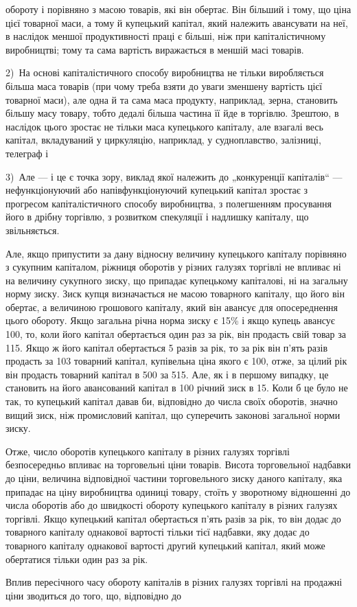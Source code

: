 \parcont{}  %
обороту і порівняно з масою товарів, які він обертає. Він більший і
тому, що ціна цієї товарної маси, а тому й купецький капітал,
який належить авансувати на неї, в наслідок меншої продуктивності
праці є більші, ніж при капіталістичному виробництві;
тому та сама вартість виражається в меншій масі товарів.

2)~На основі капіталістичного способу виробництва не тільки
виробляється більша маса товарів (при чому треба взяти до
уваги зменшену вартість цієї товарної маси), але одна й та сама
маса продукту, наприклад, зерна, становить більшу масу товару,
тобто дедалі більша частина її йде в торгівлю. Зрештою, в наслідок
цього зростає не тільки маса купецького капіталу, але
взагалі весь капітал, вкладуваний у циркуляцію, наприклад, у
судноплавство, залізниці, телеграф і~

3)~Але — і це є точка зору, виклад якої належить до „конкуренції
капіталів“ — нефункціонуючий або напівфункціонуючий
купецький капітал зростає з прогресом капіталістичного способу
виробництва, з полегшенням просування його в дрібну торгівлю,
з розвитком спекуляції і надлишку капіталу, що звільняється.

Але, якщо припустити за дану відносну величину купецького
капіталу порівняно з сукупним капіталом, ріжниця оборотів
у різних галузях торгівлі не впливає ні на величину сукупного
зиску, що припадає купецькому капіталові, ні на загальну норму
зиску. Зиск купця визначається не масою товарного капіталу,
що його він обертає, а величиною грошового капіталу, який він
авансує для опосереднення цього обороту. Якщо загальна річна
норма зиску є 15\% і якщо купець авансує 100,
то, коли його капітал обертається один раз за рік, він продасть
свій товар за 115. Якщо ж його капітал обертається 5 разів за
рік, то за рік він п’ять разів продасть за 103 товарний капітал,
купівельна ціна якого є 100, отже, за цілий рік він продасть
товарний капітал в 500 за 515. Але, як і в першому випадку, це
становить на його авансований капітал в 100 річний зиск в 15.
Коли б це було не так, то купецький капітал давав би, відповідно
до числа своїх оборотів, значно вищий зиск, ніж промисловий
капітал, що суперечить законові загальної норми зиску.

Отже, число оборотів купецького капіталу в різних галузях
торгівлі безпосередньо впливає на торговельні ціни товарів. Висота
торговельної надбавки до ціни, величина відповідної частини
торговельного зиску даного капіталу, яка припадає на ціну
виробництва одиниці товару, стоїть у зворотному відношенні
до числа оборотів або до швидкості обороту купецького
капіталу в різних галузях торгівлі. Якщо купецький капітал
обертається п’ять разів за рік, то він додає до товарного капіталу
однакової вартості тільки  тієї надбавки, яку додає до товарного
капіталу однакової вартості другий купецький капітал, який може
обертатися тільки один раз за рік.

Вплив пересічного часу обороту капіталів в різних галузях
торгівлі на продажні ціни зводиться до того, що, відповідно до
\parbreak{}  %
